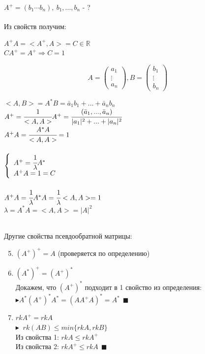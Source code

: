 \documentclass[12pt]{article}
\theoremstyle{definition}
\numberwithin{equation}{section}
\begin{document}
$A^+=(b_1 \cdots b_n), ~ b_1,...,b_n$ - ?\\ \\
Из свойств получим:
\begin{center}
$A^+A=<A^+, A>=C \in \mathbb{R}$\\
$CA^+=A^+ \Rightarrow C=1$\\
\end{center}
\[A=\begin{pmatrix}
a_1 \\
\vdots \\         
a_n
\end{pmatrix}, B=\begin{pmatrix}
b_1 \\
\vdots \\         
b_n
\end{pmatrix}\] 
\begin{center}
$<A, B>=A^*B=\bar a_1 b_1+...+\bar a_n b_n$\\ 
$A^+=\cfrac{1}{<A, A>}A^+=\cfrac{(\bar a_1,..., \bar a_n)}{|a_1|^2+...+|a_n|^2}$\\ 
$A^+A=\cfrac{A^*A}{<A, A>}=1$\\~\\
$
\left\{  
\begin{array}{ll}  
    A^+=\cfrac{1}{\lambda}A^*\\
    A^+A=1=C
\end{array}   
\right.  
$
\\ ~\\
$A^+A=\cfrac{1}{\lambda}A^*A=\cfrac{1}{\lambda}<A, A>=1$\\
$\lambda =A^*A=<A, A>=|A|^2$\\
\end{center} 
~\\Другие свойства псевдообратной матрицы:
\begin{enumerate}
\setcounter{enumi}{4}
\item $(A^+)^+=A$ (проверяется по определению)
\item $(A^*)^+=(A^+)^*$\\
Докажем, что $(A^+)^*$ подходит в 1 свойство из определения:\\
$\blacktriangleright A^*(A^+)^*A^*=(AA^+A)^*=A^* ~~\blacksquare$
\item $rkA^+=rkA$\\
$\blacktriangleright$ $~rk(AB) \leqslant min\{rkA, rkB\}$\\
Из свойства 1: $rkA \leqslant rkA^+$\\
Из свойства 2: $rkA^+ \leqslant rkA ~~\blacksquare$
\end{enumerate}
\end{document}
